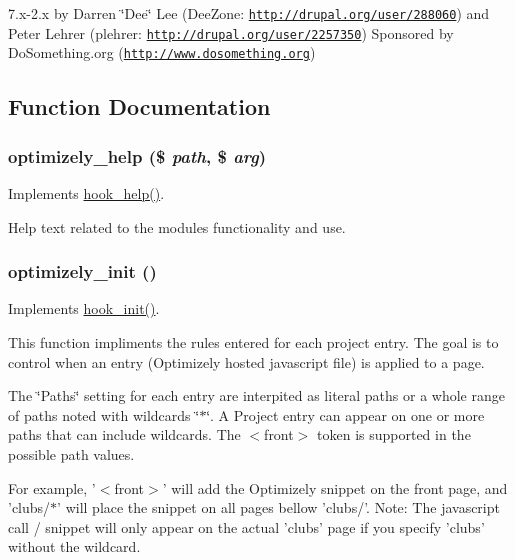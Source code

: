7.x-\/2.x by Darren \char`\"{}Dee\char`\"{} Lee (DeeZone: \href{http://drupal.org/user/288060}{\tt http://drupal.org/user/288060}) and Peter Lehrer (plehrer: \href{http://drupal.org/user/2257350}{\tt http://drupal.org/user/2257350}) Sponsored by DoSomething.org (\href{http://www.dosomething.org}{\tt http://www.dosomething.org}) 

\subsection{Function Documentation}
\hypertarget{optimizely_8module_a8f28de2408f1d21dc8026b1c5b4f37be}{
\subsubsection[{optimizely\_\-help}]{\setlength{\rightskip}{0pt plus 5cm}optimizely\_\-help (\$ {\em path}, \/  \$ {\em arg})}}
\label{optimizely_8module_a8f28de2408f1d21dc8026b1c5b4f37be}
Implements \hyperlink{group__hooks_ga5589c2714a782738e8851c4c90231f0e}{hook\_\-help()}.

Help text related to the modules functionality and use. \hypertarget{optimizely_8module_a84b6132a6cd43fb33b4f482a0e4f7363}{
\subsubsection[{optimizely\_\-init}]{\setlength{\rightskip}{0pt plus 5cm}optimizely\_\-init ()}}
\label{optimizely_8module_a84b6132a6cd43fb33b4f482a0e4f7363}
Implements \hyperlink{group__hooks_ga74edef0c463436fdbb1f92ef367db051}{hook\_\-init()}.

This function impliments the rules entered for each project entry. The goal is to control when an entry (Optimizely hosted javascript file) is applied to a page.

The \char`\"{}Paths\char`\"{} setting for each entry are interpited as literal paths or a whole range of paths noted with wildcards \char`\"{}$\ast$\char`\"{}. A Project entry can appear on one or more paths that can include wildcards. The $<$front$>$ token is supported in the possible path values.

For example, '$<$front$>$' will add the Optimizely snippet on the front page, and 'clubs/$\ast$' will place the snippet on all pages bellow 'clubs/'. Note: The javascript call / snippet will only appear on the actual 'clubs' page if you specify 'clubs' without the wildcard.

